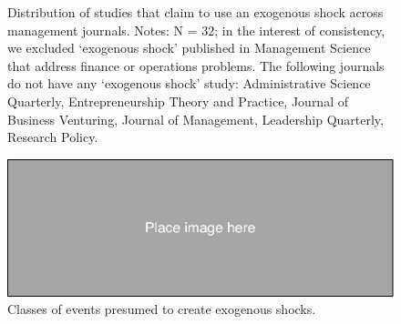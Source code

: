 \begin{refsection}
\begin{figure}[!htbp]
    \normalsize
    \centering
    \caption{Distribution of studies that claim to use an exogenous shock across
    management journals.  Notes: N = 32; in the interest of consistency, we
    excluded `exogenous shock' published in Management Science that address
    finance or operations problems. The following journals do not have any
    `exogenous shock' study: Administrative Science Quarterly, Entrepreneurship
    Theory and Practice, Journal of Business Venturing, Journal of Management,
    Leadership Quarterly, Research Policy.}
    \label{fig:studies_across_journals}
\end{figure}         

\begin{figure}[!htbp]
    \centering
    \includegraphics[width=1\textwidth]{exhibits/place_holder.pdf}
    \caption{Classes of events presumed to create exogenous shocks.}
    \label{fig:studies_over_time}
\end{figure}


\end{refsection}
